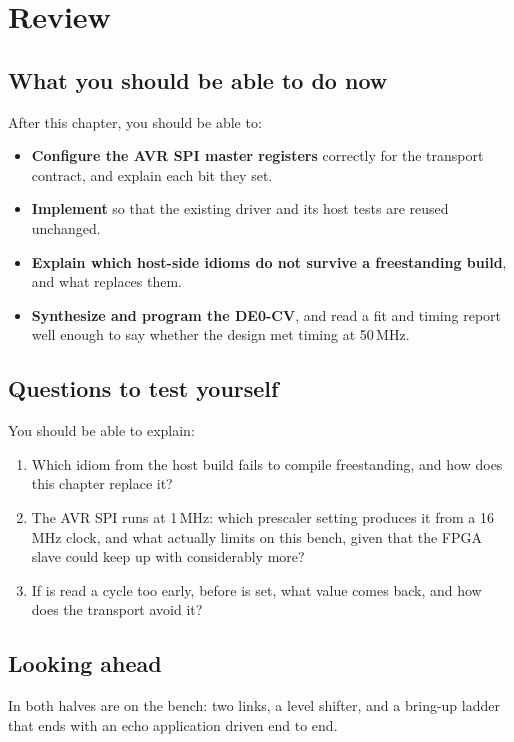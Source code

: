 
\section{Review}
\label{c9:sec:review}

\subsection*{What you should be able to do now}
After this chapter, you should be able to:
\begin{itemize}
  \item \textbf{Configure the AVR SPI master registers} correctly for the transport contract, and
    explain each bit they set.
  \item \textbf{Implement } so that the existing driver and its host tests are reused
    unchanged.
  \item \textbf{Explain which host-side idioms do not survive a freestanding build}, and what
    replaces them.
  \item \textbf{Synthesize and program the DE0-CV}, and read a fit and timing report well enough to
    say whether the design met timing at 50\,MHz.
\end{itemize}

\subsection*{Questions to test yourself}
You should be able to explain:
\begin{enumerate}
  \item Which idiom from the host build fails to compile freestanding, and how does this chapter
    replace it?
  \item The AVR SPI runs at 1\,MHz: which prescaler setting produces it from a 16\,MHz clock, and
    what actually limits  on this bench, given that the FPGA slave could keep up with
    considerably more?
  \item If  is read a cycle too early, before  is set, what value comes back,
    and how does the transport avoid it?
\end{enumerate}

\subsection*{Looking ahead}
In  both halves are on the bench: two links, a level shifter, and a bring-up ladder that
ends with an echo application driven end to end.
